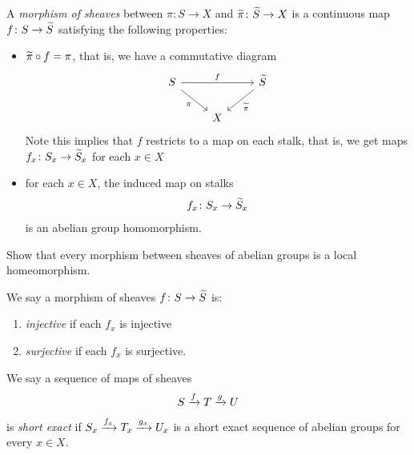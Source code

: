 \documentclass[11pt]{book}
\begin{document}
\begin{definition} A \emph{morphism of sheaves} between $\pi \colon S\to X$ and $\widetilde{\pi} \colon \widetilde{S} \to X$ is a continuous map $f \colon S \to \widetilde{S}$ satisfying the following properties:
\begin{itemize}
    \item $\widetilde{\pi}\circ f = \pi$, that is, we have a commutative diagram
\[ \begin{tikzcd}
    S\ar[dr,"\pi" below left]\ar[rr,"f"] &  & \til{S}\ar[dl,"\til{\pi}" below right]\\
     & X & 
\end{tikzcd} \]
    Note this implies that $f$ restricts to a map on each stalk, that is, we get maps $f_x \colon S_x \to \widetilde{S}_x$ for each $x\in X$
    \item for each $x\in X$, the induced map on stalks
    \begin{align*}
        f_x \colon S_x \to \widetilde{S}_x
    \end{align*}
    is an abelian group homomorphism.
\end{itemize}
\end{definition}

\begin{exercise} Show that every morphism between sheaves of abelian groups is a local homeomorphism.
\end{exercise}



\begin{definition}\label{def:injective-surjective-mononomorphism-of-sheaves} 
We say a morphism of sheaves $f \colon S \to \widetilde{S}$ is:
\begin{enumerate}
    \item \emph{injective} if each $f_x$ is injective
    \item \textit{surjective} if each $f_x$ is surjective.
\end{enumerate}
We say a sequence of maps of sheaves
\begin{align*}
    S \xrightarrow{f} T \xrightarrow{g} U
\end{align*}
is \emph{short exact} if $S_x \xrightarrow{f_x} T_x \xrightarrow{g_x} U_x$ is a short exact sequence of abelian groups for every $x\in X$.
\end{definition}
\end{document}
